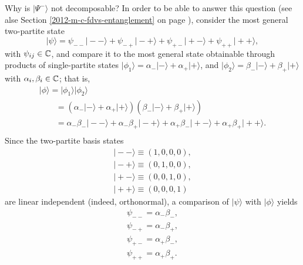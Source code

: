 {Why is $\vert \Psi^-\rangle$ not decomposable?
In order to be able to answer this question
(see alse Section \ref{2012-m-c-fdvs-entanglement} on page \pageref{2012-m-c-fdvs-entanglement}), consider
the most general two-partite state
\begin{equation}
\vert \psi \rangle
=
\psi_{--}\vert -- \rangle
+
\psi_{-+}\vert -+ \rangle
+
\psi_{+-}\vert +- \rangle
+
\psi_{++}\vert ++ \rangle
,
\end{equation}
with $\psi_{ij}\in {\Bbb C}$,
and compare it to the most general state obtainable through products of single-partite states
$\vert \phi_1\rangle  = \alpha_-  \vert - \rangle    + \alpha_+  \vert + \rangle$,
and
$\vert \phi_2\rangle  = \beta_-  \vert - \rangle    + \beta_+  \vert + \rangle$
with $\alpha_{i}, \beta_i \in {\Bbb C}$;
that is,
\begin{equation}
\begin{split}
\vert \phi \rangle  =\vert \phi_1\rangle    \vert \phi_2\rangle   \\
\qquad =
(\alpha_-  \vert - \rangle    + \alpha_+  \vert + \rangle )
(\beta_-  \vert - \rangle    + \beta_+  \vert + \rangle )   \\
\qquad  =\alpha_- \beta_- \vert -- \rangle    + \alpha_-\beta_+  \vert -+ \rangle +
\alpha_+ \beta_- \vert +- \rangle    + \alpha_+\beta_+  \vert ++ \rangle. \\
\end{split}
\end{equation}
Since the two-partite basis states
\begin{equation}
\begin{split}
\vert -- \rangle  \equiv (1,0,0,0)
,\\
\vert -+ \rangle    \equiv (0,1,0,0)
,\\
\vert +- \rangle     \equiv (0,0,1,0)
,\\
\vert ++ \rangle      \equiv (0,0,0,1)
\end{split}
\end{equation}
are linear independent (indeed, orthonormal),
a comparison of $\vert \psi \rangle  $ with  $\vert \phi \rangle$ yields
\begin{equation}
\begin{split}
\psi_{--}=  \alpha_- \beta_-
,\\
\psi_{-+}=   \alpha_-\beta_+
,\\
\psi_{+-}=  \alpha_+ \beta_-
,\\
\psi_{++}= \alpha_+\beta_+
.
\end{split}
\end{equation}
}
